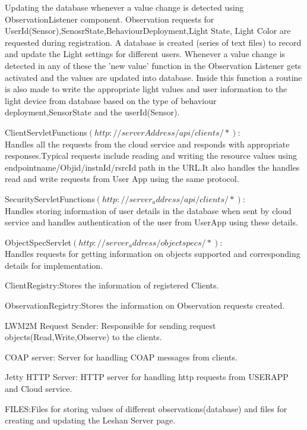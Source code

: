 Updating the database whenever a value change is detected using ObservationListener component. Observation requests for UserId(Sensor),SenosrState,BehaviourDeployment,Light State, Light Color are requested during registration. A database is created (series of text files) to record and update the Light settings for different users. Whenever a value change is detected in any of these the 'new value' function in the Observation Listener gets activated and the values are updated into database. Inside this function a routine is also made to write the appropriate light values and user information to the light device from database based on the type of behaviour deployment,SensorState and the userId(Sensor).


ClientServletFunctions$(http://serverAddress/api/clients/*)$:\\
Handles all the requests from the cloud service and responds with appropriate responses.Typical requests include reading and writing the resource values using endpointname/Objid/instnId/rsrcId path in the URL.It also handles the handles read and write requests from User App using the same protocol.


SecurityServletFunctions$(http://server_address/api/clients/*)$:\\
Handles storing information of user details in the database  when sent by cloud service and handles authentication of the user from UserApp using these details.

ObjectSpecServlet$(http://server_address/objectspecs/*)$:\\
Handles requests for getting information on objects supported and corresponding details for implementation.


ClientRegistry:Stores the information of registered Clients.

ObservationRegistry:Stores the information on Observation requests created.

LWM2M Request Sender: Responsible for sending request objects(Read,Write,Observe) to the clients.

COAP server: Server for handling COAP messages from clients.

Jetty HTTP Server: HTTP server for handling http requests from USERAPP and Cloud service.

FILES:Files for storing values of different observations(database) and files for creating and updating the Leshan Server page. 

